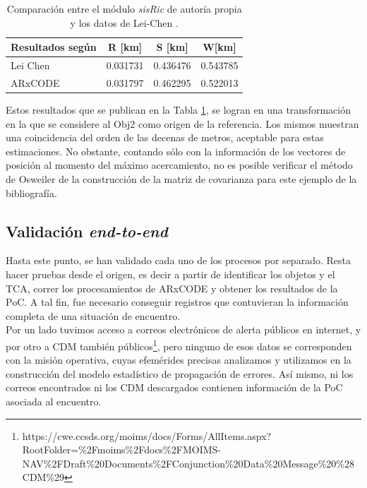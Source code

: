 \begin{table}[!h]
\caption{Comparaci\'on entre el m\'odulo {\it{sisRic}} de autor\'ia propia \\y los datos de Lei-Chen \citep{leichen}.}
\begin{tabular}{lccc}
\hline
Resultados seg\'un & R [km] & S [km] & W[km] \\
\hline
Lei Chen & 0.031731& 0.436476&0.543785\\
ARxCODE & 0.031797& 0.462295 &0.522013
\\
\hline
\end{tabular}
\label{tab:rswcomp}
\end{table}

Estos resultados que se publican en la Tabla \ref{tab:rswcomp}, se logran en una transformaci\'on en la que se considere al Obj2 como origen de la referencia. Los mismos muestran una coincidencia del orden de las decenas de metros, aceptable para estas estimaciones.
No obstante, contando s\'olo con la informaci\'on de los vectores de posici\'on al momento del m\'aximo acercamiento, no es posible verificar el m\'etodo de Osweiler de la construcci\'on de la matriz de covarianza para este ejemplo de la bibliograf\'ia.\\

\subsection*{Validaci\'on {\it{end-to-end}}}
Hasta este punto, se han validado cada uno de los procesos por separado.
Resta hacer pruebas desde el origen, es decir a partir de identificar los objetos y el TCA, correr los procesamientos de ARxCODE y obtener los resultados de la PoC.
A tal fin, fue necesario conseguir registros que contuvieran la informaci\'on completa de una situaci\'on de encuentro.\\

Por un lado tuvimos acceso a correos electr\'onicos de alerta p\'ublicos en internet, y por otro a CDM tambi\'en p\'ublicos\footnote{https://cwe.ccsds.org/moims/docs/Forms/AllItems.aspx?RootFolder=\%2Fmoims\%2Fdocs\%2FMOIMS-NAV\%2FDraft\%20Documents\%2FConjunction\%20Data\%20Message\%20\%28CDM\%29}, pero ninguno de esos datos se corresponden con la misi\'on operativa, cuyas efem\'erides precisas analizamos y utilizamos en la construcci\'on del modelo estad\'istico de propagaci\'on de errores.
As\'i mismo, ni los correos encontrados ni los CDM descargados contienen informaci\'on de la PoC asociada al encuentro. \\

